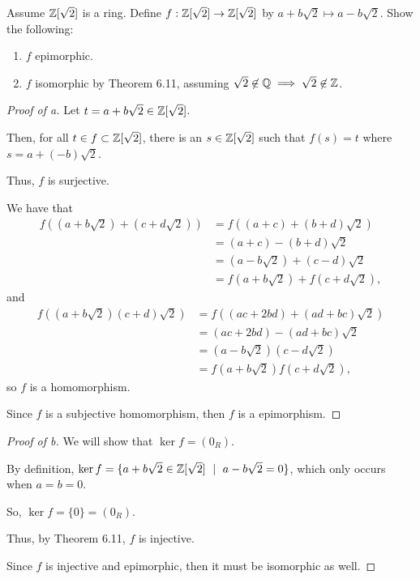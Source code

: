 \documentclass[../hw8]{subfiles}
\begin{document}
\begin{problem}
Assume $\mathbb{Z}[\sqrt{2} ]$ is a ring.
Define $f:\mathbb{Z}[\sqrt{2} ]\to \mathbb{Z}[\sqrt{2} ]$ by $a+b\sqrt{2}\mapsto a-b\sqrt{2}$.
Show the following:
\begin{enumerate}[label=\alph*)]
	\item $f$ epimorphic.
	\item $f$ isomorphic by Theorem 6.11, assuming  $\sqrt{2}\not\in \mathbb{Q}\implies \sqrt{2} \not\in \mathbb{Z} $.
\end{enumerate}
\end{problem}
\begin{proof}[Proof of a]
	Let $t=a + b\sqrt{2}\in \mathbb{Z}[\sqrt{2} ] $.

	Then, for all $t\in {f}\subset \mathbb{Z}[\sqrt{2} ]$, there is an $s \in \mathbb{Z}[\sqrt{2} ]$ such that $f(s)=t$ where $s=a+(-b)\sqrt{2}$.

	Thus, $f$ is surjective.

	We have that
	\begin{align*}
		f((a+b\sqrt{2} )+(c+d\sqrt{2} )) & = f((a+c)+(b+d)\sqrt{2})           \\
		                                 & =(a+c)-(b+d)\sqrt{2}               \\
		                                 & = (a-b\sqrt{2})+(c-d)\sqrt{2}      \\
		                                 & = f(a+b\sqrt{2}) + f(c+d\sqrt{2} )
		,\end{align*}
	and
	\begin{align*}
		f((a+b\sqrt{2} )(c+d)\sqrt{2} ) & = f((ac+2bd)+(ad+bc)\sqrt{2} )   \\
		                                & = (ac+2bd)-(ad+bc)\sqrt{2}       \\
		                                & = (a-b\sqrt{2} )(c-d\sqrt{2} )   \\
		                                & = f(a+b\sqrt{2} )f(c+d\sqrt{2} )
		,\end{align*}
	so $f$ is a homomorphism.

	Since $f$ is a subjective homomorphism, then $f$ is a epimorphism.
\end{proof}
\begin{proof}[Proof of b]
	We will show that $\ker{f} = (0_R) $.

	By definition, $\ker{f}=\{a+b\sqrt{2}\in \mathbb{Z}[\sqrt{2} ]\ \mid\ a-b\sqrt{2}=0  \}  $,
	which only occurs when $a=b=0$.

	So,  $\ker{f} = \{0\}=(0_R)  $.

	Thus, by Theorem 6.11, $f$ is injective.

	Since  $f$ is injective and epimorphic, then it must be isomorphic as well.
\end{proof}
\end{document}
